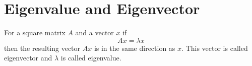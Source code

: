 \chapter{Eigenvalue and Eigenvector}

For a square matrix $A$ and a vector $x$ if
\[
  Ax = \lambda x
\]
then the resulting vector $Ax$ is in the same direction as $x$. This vector is called eigenvector and $\lambda$ is called eigenvalue.
